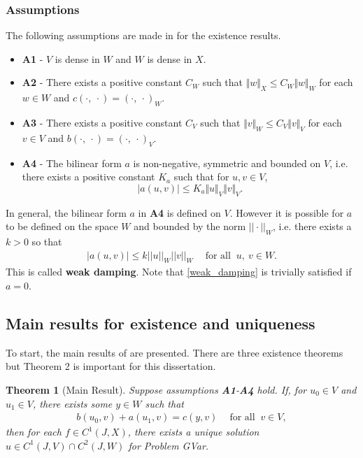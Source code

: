 \documentclass[../../main.tex]{subfiles}
\begin{document}
\subsubsection*{Assumptions} \label{sssec:existence:Assumptions}
The following assumptions are made in \cite{VV02} for the existence results.
\begin{itemize}
	\item[] \textbf{A1} - $V$ is dense in $W$ and $W$ is dense in $X$.

	\item[] \textbf{A2} - There exists a positive constant $C_{W}$ such that $\Vert w\Vert_{X} \leq C_{W}\Vert w\Vert_{W}$ for each $ w\in W$ and $c(\cdot,\ \cdot) =(\cdot,\ \cdot)_{W}$.

	\item[] \textbf{A3} - There exists a positive constant $C_{V}$ such that $\Vert v\Vert_{W} \leq C_{V}\Vert v\Vert_{V}$ for each $v \in V$ and $b(\cdot,\ \cdot) =(\cdot,\ \cdot)_{V}$.

	\item[] \textbf{A4} - The bilinear form $a$ is non-negative, symmetric and bounded on $V$, i.e. there exists a positive constant $K_a$ such that for $\displaystyle u,v \in V$, \[|a(u,v)| \leq K_a\Vert u \Vert_V \Vert v \Vert_V.\]
\end{itemize}


In general, the bilinear form $a$ in \textbf{A4} is defined on $V$. However it is possible for $a$ to be defined on the space $W$ and bounded by the norm $||\cdot||_W$, i.e. there exists a $k > 0$ so that
\begin{eqnarray}
	|a(u,v)| \leq k ||u||_W||v||_W \ \ \ \ \textrm{ for all } \ u,\ v \in W. \label{weak_damping}
\end{eqnarray} This is called \textbf{weak damping}. Note that \eqref{weak_damping} is trivially satisfied if $a = 0$.



\subsection{Main results for existence and uniqueness}\label{ssec:existence:MainResultsExistence}
To start, the main results of \cite{VV02} are presented. There are three existence theorems but Theorem 2 is important for this dissertation.

\newtheorem{Thmx}{Theorem}
\begin{Thmx}[{Main Result}]
	Suppose assumptions \textbf{A1}-\textbf{A4} hold. If, for $u_0 \in V$ and $u_1 \in V$, there exists some $y \in W$ such that
	\begin{eqnarray}
		b(u_0,v) + a(u_1,v) = c(y,v) \ \ \ \ \textrm{ for all } \ v \in V, \label{bilinear_equation}
	\end{eqnarray}
	then for each $f \in C^1(J,X)$, there exists a unique solution $u \in C^1(J,V)\cap C^2(J,W)$ for Problem GVar.
\end{Thmx}
\end{document}

